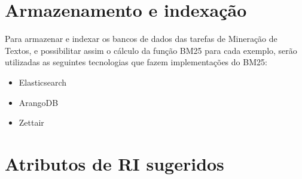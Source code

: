 \section{Armazenamento e indexação} \label{sec:Armazenamento-e-indexação}

    Para armazenar e indexar os bancos de dados das tarefas de Mineração de Textos, e possibilitar assim o cálculo da função BM25 para cada exemplo, serão utilizadas as seguintes tecnologias que fazem implementações do BM25:
    \begin{itemize}
        \item Elasticsearch %
        \item ArangoDB
        \item Zettair
    \end{itemize}
    

 



\section{Atributos de RI sugeridos}  \label{sec:Atributos-de-RI-sugeridos}
    




